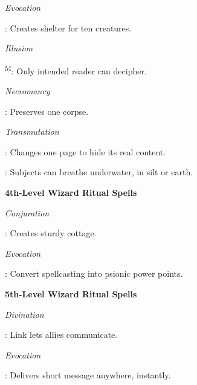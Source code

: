 \noindent\textit{Evocation}
\begin{itemize*}
	\item[] : Creates shelter for ten creatures.
\end{itemize*}

\noindent\textit{Illusion}
\begin{itemize*}
	\item[] \textsuperscript{M}: Only intended reader can decipher.
\end{itemize*}

\noindent\textit{Necromancy}
\begin{itemize*}
	\item[] : Preserves one corpse.
\end{itemize*}

\noindent\textit{Transmutation}
\begin{itemize*}
	\item[] : Changes one page to hide its real content.
	\item[] : Subjects can breathe underwater, in silt or earth. %
\end{itemize*}

\noindent\textbf{4th-Level Wizard Ritual Spells}

\noindent\textit{Conjuration}
\begin{itemize*}
	\item[] : Creates sturdy cottage.
\end{itemize*}

\noindent\textit{Evocation}
\begin{itemize*}
	\item[] : Convert spellcasting into psionic power points.
\end{itemize*}

\noindent\textbf{5th-Level Wizard Ritual Spells}

\noindent\textit{Divination}
\begin{itemize*}
	\item[] : Link lets allies communicate.
\end{itemize*}

\noindent\textit{Evocation}
\begin{itemize*}
	\item[] : Delivers short message anywhere, instantly.
\end{itemize*}

